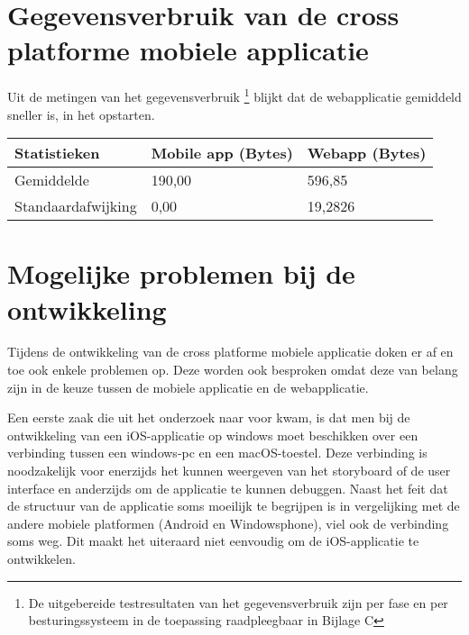 \section{Gegevensverbruik van de cross platforme mobiele applicatie}
Uit de metingen van het gegevensverbruik \footnote{De uitgebereide testresultaten van het gegevensverbruik zijn per fase en per besturingssysteem in de toepassing raadpleegbaar in Bijlage C}
blijkt dat de webapplicatie gemiddeld sneller is, in het opstarten.
\begin{center}
  \begin{tabular}{| l | l | l |}
    \hline
    Statistieken & Mobile app (Bytes) & Webapp (Bytes) \\ \hline
    Gemiddelde & 190,00 & 596,85 \\ \hline
    Standaardafwijking & 0,00 & 19,2826 \\
    \hline
  \end{tabular}
\end{center}
\section{Mogelijke problemen bij de ontwikkeling}
Tijdens de ontwikkeling van de cross platforme mobiele applicatie doken er af en toe ook enkele problemen op.
Deze worden ook besproken omdat deze van belang zijn in de keuze tussen de mobiele applicatie en de webapplicatie.

Een eerste zaak die uit het onderzoek naar voor kwam, is dat men bij de ontwikkeling van een iOS-applicatie op windows moet beschikken
over een verbinding tussen een windows-pc en een macOS-toestel. Deze verbinding is noodzakelijk voor enerzijds het kunnen weergeven van
het storyboard of de user interface en anderzijds om de applicatie te kunnen debuggen. Naast het feit dat de structuur van de applicatie
soms moeilijk te begrijpen is in vergelijking met de andere mobiele platformen (Android en Windowsphone), viel ook de verbinding soms weg.
Dit maakt het uiteraard niet eenvoudig om de iOS-applicatie te ontwikkelen.
